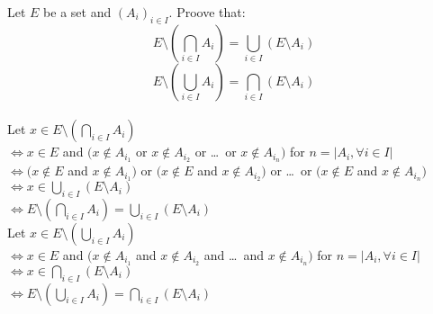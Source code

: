 \documentclass{article}
\begin{document}
\noindent Let $E$ be a set and $(A_i)_{i\in I}$. Proove
that:\\
\[
E \setminus (\bigcap_{i \in I}A_i) =
\bigcup_{i \in I}(E \setminus A_i)
\]
\[
E \setminus (\bigcup_{i \in I}A_i) =
\bigcap_{i \in I}(E \setminus A_i)
\]\\

\noindent Let $x \in E \setminus (\bigcap_{i \in I}A_i)$\\
$\iff x \in E $ and $(x \notin A_{i_1}  $ or
$ x \notin A_{i_2} $ or \dots \ or $ x \notin A_{i_n})$
for $n = |{A_i, \forall i \in I}|$\\
$\iff (x \notin E $ and $ x \notin A_{i_1}) $ or
$(x \notin E $ and $ x \notin A_{i_2}) $ or \dots\  or
$(x \notin E $ and $ x \notin A_{i_n})$
$\iff  x \in \bigcup_{i \in I}(E \setminus A_i)$\\
$\iff E \setminus (\bigcap_{i \in I}A_i) =
\bigcup_{i \in I}(E \setminus A_i)$\\


\noindent Let $x \in E \setminus (\bigcup_{i \in I}A_i)$\\
$\iff x \in E $ and $(x \notin A_{i_1}  $ and
$ x \notin A_{i_2} $ and \dots \ and $ x \notin A_{i_n})$
for $n = |{A_i, \forall i \in I}|$\\
$\iff x \in \bigcap_{i \in I}(E \setminus A_i)$\\
$\iff E \setminus (\bigcup_{i \in I}A_i) =
\bigcap_{i \in I}(E \setminus A_i)$
\end{document}
